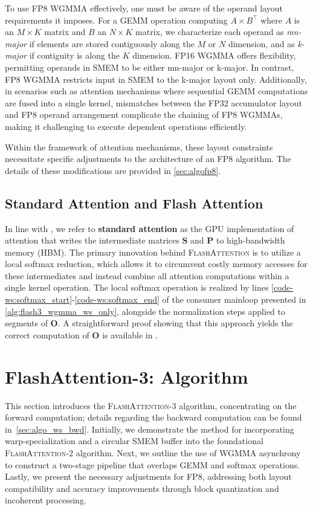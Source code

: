 \begin{enumerate}
To use FP8 WGMMA effectively, one must be aware of the operand layout requirements it imposes. For a GEMM operation computing $A \times B^{\top}$ where $A$ is an $M\times K$ matrix and $B$ an $N\times K$ matrix, we characterize each operand as \emph{mn-major} if elements are stored contiguously along the $M$ or $N$ dimension, and as \emph{k-major} if contiguity is along the $K$ dimension. FP16 WGMMA offers flexibility, permitting operands in SMEM to be either mn-major or k-major. In contrast, FP8 WGMMA restricts input in SMEM to the k-major layout only. Additionally, in scenarios such as attention mechanisms where sequential GEMM computations are fused into a single kernel, mismatches between the FP32 accumulator layout and FP8 operand arrangement complicate the chaining of FP8 WGMMAs, making it challenging to execute dependent operations efficiently.

Within the framework of attention mechanisms, these layout constraints necessitate specific adjustments to the architecture of an FP8 algorithm. The details of these modifications are provided in \cref{sec:algofp8}.

\subsection{Standard Attention and Flash Attention} In line with \citet{dao2022flashattention}, we refer to \textbf{standard attention} as the GPU implementation of attention that writes the intermediate matrices $\mathbf{S}$ and $\mathbf{P}$ to high-bandwidth memory (HBM). The primary innovation behind \textsc{FlashAttention} is to utilize a local softmax reduction, which allows it to circumvent costly memory accesses for these intermediates and instead combine all attention computations within a single kernel operation. The local softmax operation is realized by lines \ref{code-ws:softmax_start}-\ref{code-ws:softmax_end} of the consumer mainloop presented in \cref{alg:flash3_wgmma_ws_only}, alongside the normalization steps applied to segments of $\mathbf{O}$. A straightforward proof showing that this approach yields the correct computation of $\mathbf{O}$ is available in \cite[\S 2.3.1]{dao2023flashattention2}.

\section{FlashAttention-3: Algorithm}
\label{sec:algo}

This section introduces the \textsc{FlashAttention-3} algorithm, concentrating on the forward computation; details regarding the backward computation can be found in~\cref{sec:algo_ws_bwd}. Initially, we demonstrate the method for incorporating warp-specialization and a circular SMEM buffer into the foundational \textsc{FlashAttention-2} algorithm. Next, we outline the use of WGMMA asynchrony to construct a two-stage pipeline that overlaps GEMM and softmax operations. Lastly, we present the necessary adjustments for FP8, addressing both layout compatibility and accuracy improvements through block quantization and incoherent processing.


\end{enumerate}
